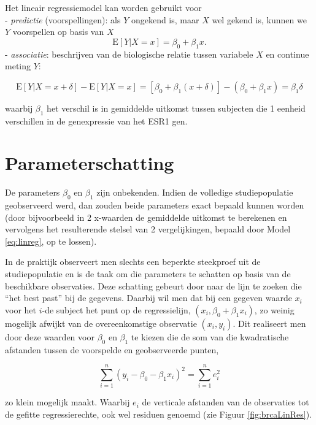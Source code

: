 \documentclass[12pt,dutch,coursenotes]{book}
\theoremstyle{definition}
\theoremstyle{definition}
\theoremstyle{definition}
\theoremstyle{remark}
\begin{document}
Het lineair regressiemodel kan worden gebruikt voor\\
- \emph{predictie} (voorspellingen): als \(Y\) ongekend is, maar \(X\)
wel gekend is, kunnen we \(Y\) voorspellen op basis van \(X\)
\[\text{E}\left[Y|X =x\right]=\beta_0 + \beta_1 x.\] -
\emph{associatie}: beschrijven van de biologische relatie tussen
variabele \(X\) en continue meting \(Y\):

\[\text{E}\left[Y|X=x+\delta\right]-\text{E}\left[Y|X=x\right]= \left[\beta_0+\beta_1(x+\delta)\right]-(\beta_0+\beta_1x)=\beta_1\delta\]

waarbij \(\beta_1\) het verschil is in gemiddelde uitkomst tussen
subjecten die 1 eenheid verschillen in de genexpressie van het ESR1 gen.

\section{Parameterschatting}\label{parameterschatting}

De parameters \(\beta_0\) en \(\beta_1\) zijn onbekenden. Indien de
volledige studiepopulatie geobserveerd werd, dan zouden beide parameters
exact bepaald kunnen worden (door bijvoorbeeld in 2 x-waarden de
gemiddelde uitkomst te berekenen en vervolgens het resulterende stelsel
van 2 vergelijkingen, bepaald door Model \eqref{eq:linreg}, op te lossen).

In de praktijk observeert men slechts een beperkte steekproef uit de
studiepopulatie en is de taak om die parameters te schatten op basis van
de beschikbare observaties. Deze schatting gebeurt door naar de lijn te
zoeken die ``het best past'' bij de gegevens. Daarbij wil men dat bij
een gegeven waarde \(x_i\) voor het \(i\)-de subject het punt op de
regressielijn, \((x_i, \beta_0 + \beta_1 x_i)\), zo weinig mogelijk
afwijkt van de overeenkomstige observatie \((x_i, y_i)\). Dit realiseert
men door deze waarden voor \(\beta_0\) en \(\beta_1\) te kiezen die de
som van die kwadratische afstanden tussen de voorspelde en geobserveerde
punten,

\[\sum_{i=1}^n (y_i-\beta_0-\beta_1 x_i)^2=\sum_{i=1}^n e_i^2\]

zo klein mogelijk maakt. Waarbij \(e_i\) de verticale afstanden van de
observaties tot de gefitte regressierechte, ook wel residuen genoemd
(zie Figuur \ref{fig:brcaLinRes}).
\end{document}
